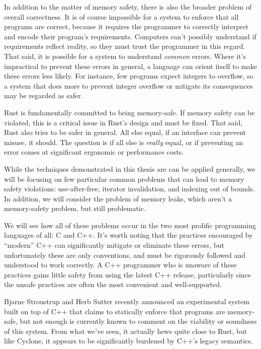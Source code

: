 In addition to the matter of memory safety, there is also the broader problem
of overall correctness. It is of course impossible for a system to enforce
that all programs are correct, because it requires the programmer to
correctly interpret and encode their program's requirements. Computers can't
possibly understand if requirements reflect reality, so they must trust the
programmer in this regard. That said, it is possible for a system to understand
\emph{common} errors. Where it's impractical to prevent these errors in general,
a language can orient itself to make these errors less likely. For instance,
few programs expect integers to overflow, so a system that does more to prevent
integer overflow or mitigate its consequences may be regarded as safer.

Rust is fundamentally committed to being memory-safe. If memory safety can
be violated, this is a critical issue in Rust's design and must be fixed. That said,
Rust also tries to be safer in general. All else equal, if an interface can
prevent misuse, it should. The question is if all else is
\emph{really} equal, or if preventing an error comes at significant ergonomic or
performance costs.

While the techniques demonstrated in this thesis are can be applied generally,
we will be focusing on few particular common problems that can lead to
memory safety violations: use-after-free, iterator invalidation, and indexing
out of bounds. In addition, we will consider the problem of memory leaks, which
aren't a memory-safety problem, but still problematic.

We will see how all of these problems occur in the two most prolific programming
languages of all: C and C++. It's worth noting that the practices encouraged
by ``modern'' C++ can significantly mitigate or eliminate these errors, but
unfortunately these are only conventions, and must be rigorously followed
and understood to work correctly. A C++ programmer who is unaware of these
practices gains little safety from using the latest C++ release, particularly
since the unsafe practices are often the most convenient and well-supported.

Bjarne Stroustrup and Herb Sutter recently announced an experimental system
built on top of C++ that claims to statically enforce that programs are memory-
safe, but not enough is currently known to comment on the viability or soundness
of this system. From what we've seen, it actually hews quite close to Rust, but
like Cyclone, it appears to be significantly burdened by C++'s legacy semantics.




